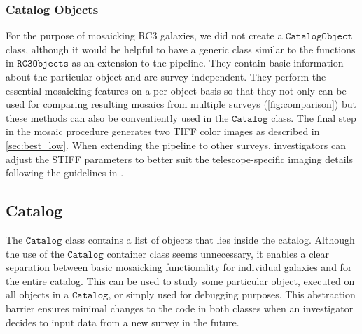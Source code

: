 \documentclass[5p]{elsarticle}
\begin{document}
	\subsubsection{Catalog Objects}
	For the purpose of mosaicking RC3 galaxies, we did not create a $\texttt{CatalogObject}$ class, although it would be helpful to have a generic class similar to the functions in $\texttt{RC3Objects}$ as an extension to the pipeline. They contain basic information about the particular object and are survey-independent. They perform the essential mosaicking features on a per-object basis so that they not only can be used for comparing resulting mosaics from multiple surveys (\autoref{fig:comparison}) but these methods can also be conventiently used in the $\texttt{Catalog}$ class. The final step in the mosaic procedure generates two TIFF color images as described in \autoref{sec:best_low}.  When extending the pipeline to other surveys, investigators can adjust the STIFF parameters to better suit the telescope-specific imaging details following the guidelines in \citet{stiff}.
    \subsection{Catalog}
	The $\texttt{Catalog}$ class contains a list of objects that lies inside the catalog. Although the use of the $\texttt{Catalog}$ container class seems unnecessary, it enables a clear separation between basic mosaicking functionality for individual galaxies and for the entire catalog. This can be used to study some particular object, executed on all objects in a $\texttt{Catalog}$, or simply used for debugging purposes. This abstraction barrier ensures minimal changes to the code in both classes when an investigator decides to input data from a new survey in the future.
\end{document}
